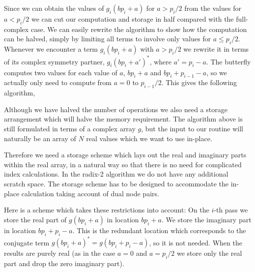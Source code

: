 \documentclass[fleqn,12pt]{article}
\newenvironment{algorithm}{\begin{quote} %
\begin{algorithmic}\samepage}{\end{algorithmic} %
\end{quote}}
\begin{document}
Since we can obtain the values of $g_i(b p_i + a)$ for $a > p_i/2$
from the values for $a < p_i/2$ we can cut our computation and
storage in half compared with the full-complex case.
%
We can easily rewrite the algorithm to show how the computation can be
halved, simply by limiting all terms to involve only values for $a
\leq p_{i}/2$. Whenever we encounter a term $g_i(b p_i + a)$ with $a >
p_{i}/2$ we rewrite it in terms of its complex symmetry partner,
$g_i(b p_i + a')^*$, where $a' = p_i - a$.  The butterfly computes two
values for each value of $a$, $b p_i + a$ and $b p_i + p_{i-1} - a$,
so we actually only need to compute from $a = 0$ to $p_{i-1}/2$.  This
gives the following algorithm,
%
\begin{algorithm}
     \ENDFOR
  \ENDFOR
\end{algorithm}
%
Although we have halved the number of operations we also need a
storage arrangement which will halve the memory requirement. The
algorithm above is still formulated in terms of a complex array $g$,
but the input to our routine will naturally be an array of $N$ real
values which we want to use in-place.

Therefore we need a storage scheme which lays out the real and
imaginary parts within the real array, in a natural way so that there
is no need for complicated index calculations. In the radix-2
algorithm we do not have any additional scratch space. The storage
scheme has to be designed to accommodate the in-place calculation
taking account of dual node pairs.

Here is a scheme which takes these restrictions into account: On the
$i$-th pass we store the real part of $g(b p_i + a)$ in location $b
p_i + a$. We store the imaginary part in location $b p_i + p_i -
a$. This is the redundant location which corresponds to the conjugate
term $g(b p_i + a)^* = g(b p_i + p_i -a)$, so it is not needed.  When
the results are purely real (as in the case $a = 0$ and $a = p_i/2$ we
store only the real part and drop the zero imaginary part).
\end{document}
